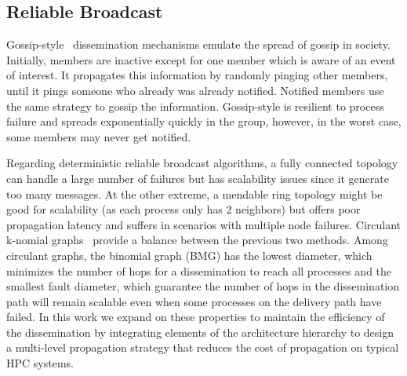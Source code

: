 \documentclass[sigconf]{acmart}
\begin{document}
\subsection{Reliable Broadcast}
%
%
Gossip-style~\cite{infection-style,Abhinandan02} dissemination mechanisms emulate the spread of gossip in society. Initially, members are inactive except for one member which is aware of an event of interest. It propagates this information by randomly pinging other members, until it pings someone who already was already notified. Notified members use the same strategy to gossip the information. Gossip-style is resilient to process failure and spreads exponentially quickly in the group, however, in the worst case, some members may never get notified.   

Regarding deterministic reliable broadcast algorithms, a fully connected topology can handle a large number of failures but has scalability issues since it generate too many messages. At the other extreme, a mendable ring topology might be good for scalability (as each process only has 2 neighbors)
but offers poor propagation latency and suffers in scenarios with multiple node failures.
Circulant k-nomial graphs~\cite{Angskun07, Pava11} provide a balance between the previous two methods.
Among circulant graphs, the binomial graph (BMG) has the lowest diameter, which minimizes the number of hops for a dissemination to reach all
processes and the smallest fault diameter, which guarantee the number of hops in the dissemination path will remain scalable even when some processes on the delivery path have failed.
In this work we expand on these properties to maintain the efficiency of the dissemination by integrating elements of the
architecture hierarchy to design a multi-level propagation strategy that 
reduces the cost of propagation on typical HPC systems.
\end{document}
